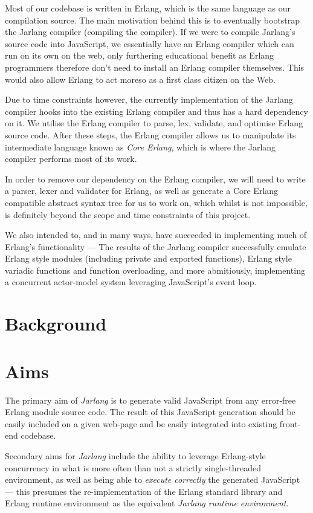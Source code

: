 \documentclass[twoside,12pt,titlepage,a4paper]{article}
\begin{document}
Most of our codebase is written in Erlang, which is the same language as our compilation source. The main motivation behind this is to eventually bootstrap the Jarlang compiler (compiling the compiler). If we were to compile Jarlang's source code into JavaScript, we essentially have an Erlang compiler which can run on its own on the web, only furthering educational benefit as Erlang programmers therefore don't need to install an Erlang compiler themselves. This would also allow Erlang to act moreso as a first class citizen on the Web.

Due to time constraints however, the currently implementation of the Jarlang compiler hooks into the existing Erlang compiler and thus has a hard dependency on it. We utilise the Erlang compiler to parse, lex, validate, and optimise Erlang source code. After these steps, the Erlang compiler allows us to manipulate its intermediate language known as \textit{Core Erlang}, which is where the Jarlang compiler performs most of its work.

In order to remove our dependency on the Erlang compiler, we will need to write a parser, lexer and validater for Erlang, as well as generate a Core Erlang compatible abstract syntax tree for us to work on, which whilst is not impossible, is definitely beyond the scope and time constraints of this project.

We also intended to, and in many ways, have succeeded in implementing much of Erlang's functionality --- The results of the Jarlang compiler successfully emulate Erlang style modules (including private and exported functions), Erlang style variadic functions and function overloading, and more abmitiously, implementing a concurrent actor-model system leveraging JavaScript's event loop.

\section{Background}
\label{Background}

\section{Aims}
\label{Aims}
The primary aim of \textit{Jarlang} is to generate valid JavaScript from any error-free Erlang module source code. The result of this JavaScript generation should be easily included on a given web-page and be easily integrated into existing front-end codebase.

Secondary aims for \textit{Jarlang} include the ability to leverage Erlang-style concurrency in what is more often than not a strictly single-threaded environment, as well as being able to \textit{execute correctly} the generated JavaScript --- this presumes the re-implementation of the Erlang standard library and Erlang runtime environment as the equivalent \textit{Jarlang runtime environment}.
\end{document}
